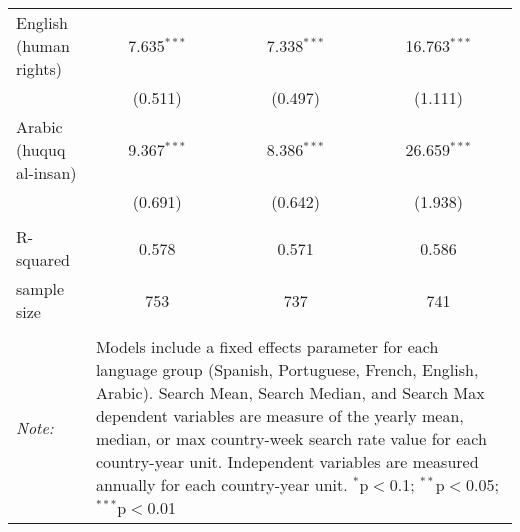 \begin{table}[!htbp]
\begin{tabular}{@{\extracolsep{5pt}}lccc}
  English (human rights) & 7.635$^{***}$ & 7.338$^{***}$ & 16.763$^{***}$ \\ 
  & (0.511) & (0.497) & (1.111) \\ 
  Arabic (huquq al-insan) & 9.367$^{***}$ & 8.386$^{***}$ & 26.659$^{***}$ \\ 
  & (0.691) & (0.642) & (1.938) \\ 
 \hline \\[-1.8ex] 
R-squared  & 0.578 & 0.571 & 0.586 \\ 
sample size  & 753 & 737 & 741 \\ 
\hline 
\hline \\[-1.8ex] 
\textit{Note:}  & \multicolumn{3}{l}{\parbox[t]{8cm}{Models include a fixed effects parameter for each language group (Spanish, Portuguese, French, English, Arabic). Search Mean, Search Median, and Search Max dependent variables are measure of the yearly mean, median, or max country-week search rate value for each country-year unit. Independent variables are measured annually for each country-year unit. $^{*}$p$<$0.1; $^{**}$p$<$0.05; $^{***}$p$<$0.01}} \\ 
\end{tabular} 
\end{table} 
